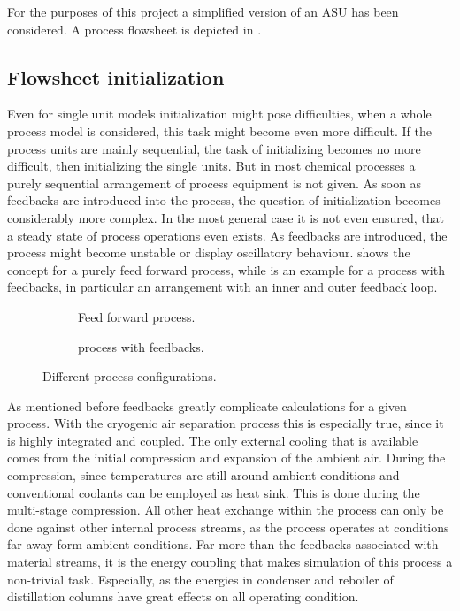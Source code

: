     For the purposes of this project a simplified version of an ASU has been considered. A process flowsheet is depicted
    in .

    \subsection{Flowsheet initialization}
        Even for single unit models initialization might pose difficulties, when a whole process model is considered,
        this task might become even more difficult. If the process units are mainly sequential, the task of initializing
        becomes no more difficult, then initializing the single units. But in most chemical processes a purely sequential
        arrangement of process equipment is not given. As soon as feedbacks are introduced into the process, the question
        of initialization becomes considerably more complex. In the most general case it is not even ensured, that a steady
        state of process operations even exists. As feedbacks are introduced, the process might become unstable or display
        oscillatory behaviour.  shows the concept for a purely feed forward process, while
         is an example for a process with feedbacks, in particular an arrangement with an inner
        and outer feedback loop.

        \begin{figure}
            \centering
            \begin{subfigure}{0.4\textwidth}
                
                \caption{Feed forward process.}
                \label{fig:foreward_process}
            \end{subfigure}
            \hspace{0.05\textwidth}
            \begin{subfigure}{0.4\textwidth}
                
                \caption{process with feedbacks.}
                \label{fig:feedback_process}
            \end{subfigure}
            \caption{Different process configurations.}
        \end{figure}

        As mentioned before feedbacks greatly complicate calculations for a given process. With the cryogenic air separation
        process this is especially true, since it is highly integrated and coupled. The only external cooling that is available
        comes from the initial compression and expansion of the ambient air. During the compression, since temperatures are
        still around ambient conditions and conventional coolants can be employed as heat sink. This is done during the
        multi-stage compression. All other heat exchange within the process can only be done against other internal process
        streams, as the process operates at conditions far away form ambient conditions. Far more than the feedbacks associated
        with material streams, it is the energy coupling that makes simulation of this process a non-trivial task. Especially, as
        the energies in condenser and reboiler of distillation columns have great effects on all operating condition.

